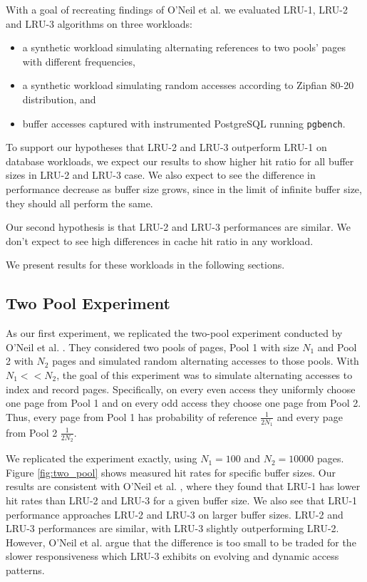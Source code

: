 With a goal of recreating findings of O'Neil et al. \cite{lruk} we evaluated LRU-1, LRU-2 and LRU-3 algorithms on three workloads:
\begin{itemize}
\item a synthetic workload simulating alternating references to two pools' pages with different frequencies,
\item a synthetic workload simulating random accesses according to Zipfian 80-20 distribution, and
\item buffer accesses captured with instrumented PostgreSQL running \texttt{pgbench}.
\end{itemize}

To support our hypotheses that LRU-2 and LRU-3 outperform LRU-1 on database workloads, we expect our results to show higher hit ratio for all buffer sizes in LRU-2 and LRU-3 case. We also expect to see the difference in performance decrease as buffer size grows, since in the limit of infinite buffer size, they should all perform the same.

Our second hypothesis is that LRU-2 and LRU-3 performances are similar. We don't expect to see high differences in cache hit ratio in any workload.

We present results for these workloads in the following sections.

\subsection{Two Pool Experiment}

As our first experiment, we replicated the two-pool experiment conducted by O'Neil et al. \cite{lruk}. They considered two pools of pages, Pool 1 with size $N_1$ and Pool 2 with $N_2$ pages and simulated random alternating accesses to those pools. With $N_1 << N_2$, the goal of this experiment was to simulate alternating accesses to index and record pages. Specifically, on every even access they uniformly choose one page from Pool 1 and on every odd access they choose one page from Pool 2. Thus, every page from Pool 1 has probability of reference $\frac{1}{2N_1}$ and every page from Pool 2 $\frac{1}{2N_2}$.

We replicated the experiment exactly, using $N_1 = 100$ and $N_2 = 10000$ pages. Figure \ref{fig:two_pool} shows measured hit rates for specific buffer sizes. Our results are consistent with O'Neil et al. \cite{lruk}, where they found that LRU-1 has lower hit rates than LRU-2 and LRU-3 for a given buffer size. We also see that LRU-1 performance approaches LRU-2 and LRU-3 on larger buffer sizes. LRU-2 and LRU-3 performances are similar, with LRU-3 slightly outperforming LRU-2. However, O'Neil et al. argue that the difference is too small to be traded for the slower responsiveness which LRU-3 exhibits on evolving and dynamic access patterns.

